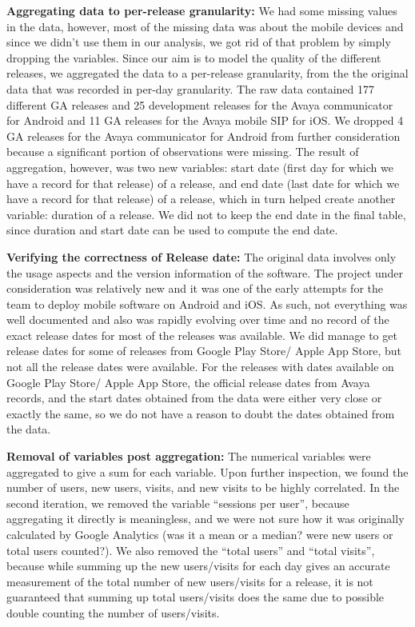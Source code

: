 \documentclass[smallextended]{svjour3}       %
\begin{document}
\noindent
\textbf{Aggregating data to per-release granularity:}
We had some missing values in the data, however, most of the missing data was about the
mobile devices and since we didn't use them in our analysis, we got rid of that
problem by simply dropping the variables. Since our aim is to model the quality of the
different releases, we aggregated the data to a per-release 
granularity, from the the original data that was recorded in per-day granularity. 
The raw data contained 177 different GA releases and 25 development releases for the 
Avaya communicator for Android and 11 GA releases for the Avaya mobile SIP for iOS. 
We dropped 4 GA releases for the Avaya communicator for Android from further 
consideration because a significant
portion of observations were missing. The result of aggregation, however,
was two new variables: start date (first day for which we have a
record for that release) of a release, and end date (last date for
which we have a record for that release) of a release, which in turn
helped create another variable: duration of a release. We did
not to keep the end date in the final table, since duration and
start date can be used to compute the end date.

\noindent
\textbf{Verifying the correctness of Release date:}
The original data involves only the usage aspects and the version
information of the software. The project under consideration was
relatively new and it was one of the early attempts for the team to deploy
mobile software on Android and iOS. As such, not everything
was well documented and also was rapidly evolving over time  and no
record of the exact release dates for most of the releases was
available. We did manage to get release dates for some of releases
from Google Play Store/ Apple App Store, but not all the release dates  were
available.  For the releases with dates available on Google Play
Store/ Apple App Store, the official release dates from Avaya records, and the start
dates obtained from the data were either very close or exactly the
same, so we do not have a reason to doubt the dates obtained from the
data. 

\noindent
\textbf{Removal  of variables post aggregation:}
The numerical variables were aggregated to give a sum for each
variable. Upon further inspection, we found the number of users, new
users, visits, and new visits to be highly correlated. In the second
iteration, we removed the variable ``sessions per user'', because
aggregating it directly is meaningless, and we were not sure how it
was originally calculated by Google Analytics (was it a mean or
a median? were new users or total users counted?). We also removed
the ``total users'' and ``total visits'', because while summing up the
new users/visits for each day gives an accurate measurement of the total
number of new users/visits for a release, it is not guaranteed that
summing up total users/visits does the same due to possible double
counting the number of users/visits. 
\end{document}
